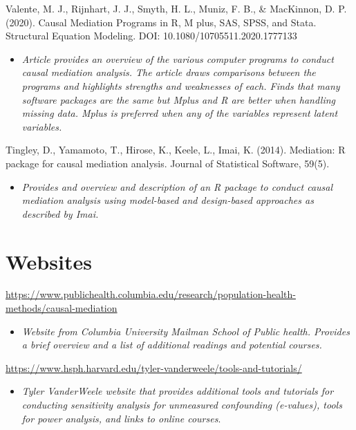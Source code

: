 \documentclass[
]{book}
\providecommand{\tightlist}{%
  \setlength{\itemsep}{0pt}\setlength{\parskip}{0pt}}
\begin{document}
Valente, M. J., Rijnhart, J. J., Smyth, H. L., Muniz, F. B., \& MacKinnon, D. P. (2020). Causal Mediation Programs in R, M plus, SAS, SPSS, and Stata. Structural Equation Modeling. DOI: 10.1080/10705511.2020.1777133

\begin{itemize}
\tightlist
\item
  \emph{Article provides an overview of the various computer programs to conduct causal mediation analysis. The article draws comparisons between the programs and highlights strengths and weaknesses of each. Finds that many software packages are the same but Mplus and R are better when handling missing data. Mplus is preferred when any of the variables represent latent variables.}
\end{itemize}

Tingley, D., Yamamoto, T., Hirose, K., Keele, L., Imai, K. (2014). Mediation: R package for causal mediation analysis. Journal of Statistical Software, 59(5).

\begin{itemize}
\tightlist
\item
  \emph{Provides and overview and description of an R package to conduct causal mediation analysis using model-based and design-based approaches as described by Imai.}
\end{itemize}

\section{Websites}\label{websites-3}

\url{https://www.publichealth.columbia.edu/research/population-health-methods/causal-mediation}

\begin{itemize}
\tightlist
\item
  \emph{Website from Columbia University Mailman School of Public health. Provides a brief overview and a list of additional readings and potential courses.}
\end{itemize}

\url{https://www.hsph.harvard.edu/tyler-vanderweele/tools-and-tutorials/}

\begin{itemize}
\tightlist
\item
  \emph{Tyler VanderWeele website that provides additional tools and tutorials for conducting sensitivity analysis for unmeasured confounding (e-values), tools for power analysis, and links to online courses}.
\end{itemize}
\end{document}
